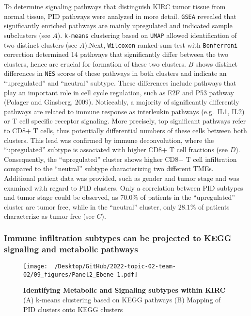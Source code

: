 \documentclass[
  parskip,
  oneside]{scrreprt}
\begin{document}
To determine signaling pathways that distinguish KIRC tumor tissue from
normal tissue, PID pathways were analyzed in more detail. \texttt{GSEA}
revealed that significantly enriched pathways are mainly upregulated and
indicated sample subclusters (see  \(A\)). \texttt{k-means}
clustering based on \texttt{UMAP} allowed identification of two distinct
clusters (see  \(A\)).Next, \texttt{Wilcoxon} ranked-sum test
with \texttt{Bonferroni} correction determined 14 pathways that
significantly differ between the two clusters, hence are crucial for
formation of these two clusters. \(B\) shows distinct
differences in \texttt{NES} scores of these pathways in both clusters
and indicate an ``upregulated'' and ``neutral'' subtype. These
differences include pathways that play an important role in cell cycle
regulation, such as E2F and P53 pathway (Polager and Ginsberg, 2009).
Noticeably, a majority of significantly differently pathways are related
to immune response as interleukin pathways (e.g.~IL1, IL2) or T cell
specific receptor signaling. More precisely, top significant pathways
refer to CD8+ T cells, thus potentially differential numbers of these
cells between both clusters. This lead was confirmed by immune
deconvolution, where the ``upregulated'' subtype is associated with
higher CD8+ T cell fractions (see  \(D\)). Consequently, the
``upregulated'' cluster shows higher CD8+ T cell infiltration compared
to the ``neutral'' subtype characterizing two different TMEs.\\
Additional patient data was provided, such as gender and tumor stage and
was examined with regard to PID clusters. Only a correlation between PID
subtypes and tumor stage could be observed, as \(70.0\%\) of patients in
the ``upregulated'' cluster are tumor free, while in the ``neutral''
cluster, only \(28.1\%\) of patients characterize as tumor free (see
 \(C\)).

\hypertarget{immune-infiltration-subtypes-can-be-projected-to-kegg-signaling-and-metabolic-pathways}{%
\subsubsection{Immune infiltration subtypes can be projected to KEGG
signaling and metabolic
pathways}\label{immune-infiltration-subtypes-can-be-projected-to-kegg-signaling-and-metabolic-pathways}}

\begin{figure}[h]
  \texttt{[image: ~/Desktop/GitHub/2022-topic-02-team-02/09\_figures/Panel2\_Ebene 1.pdf]}
  \caption{\textbf{Identifying Metabolic and Signaling subtypes within KIRC} (A) k-means clustering based on KEGG pathways (B) Mapping of PID clusters onto KEGG clusters}
  \label{kegg}
\end{figure}
\end{document}

